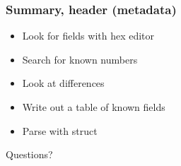 \documentclass{beamer}
\begin{document}
\begin{frame}
  \frametitle{Summary, header (metadata)}
  \begin{itemize}
  \item Look for fields with hex editor
  \item Search for known numbers
  \item Look at differences
  \item Write out a table of known fields
  \item Parse with struct
  \end{itemize}
\end{frame}

\begin{frame}
  \huge Questions?
\end{frame}
\end{document}
